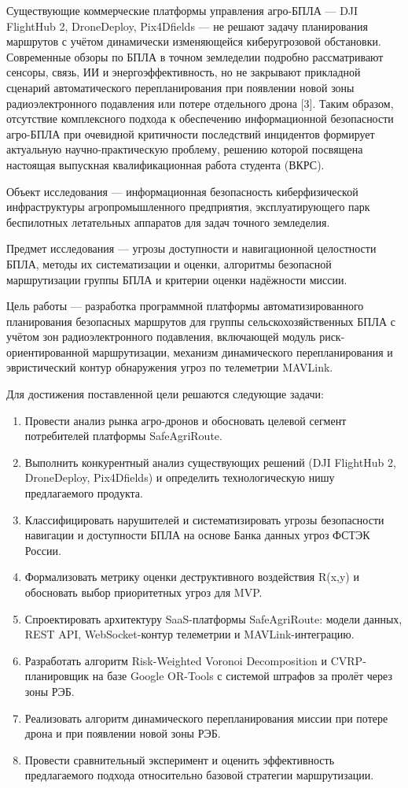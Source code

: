 \documentclass[14pt,a4paper]{extarticle}
\providecommand{\tightlist}{%
  \setlength{\itemsep}{0pt}\setlength{\parskip}{0pt}}
\begin{document}
Существующие коммерческие платформы управления агро-БПЛА --- DJI FlightHub 2, DroneDeploy, Pix4Dfields --- не решают задачу планирования маршрутов с учётом динамически изменяющейся киберугрозовой обстановки. Современные обзоры по БПЛА в точном земледелии подробно рассматривают сенсоры, связь, ИИ и энергоэффективность, но не закрывают прикладной сценарий автоматического перепланирования при появлении новой зоны радиоэлектронного подавления или потере отдельного дрона {[}3{]}. Таким образом, отсутствие комплексного подхода к обеспечению информационной безопасности агро-БПЛА при очевидной критичности последствий инцидентов формирует актуальную научно-практическую проблему, решению которой посвящена настоящая выпускная квалификационная работа студента (ВКРС).

Объект исследования --- информационная безопасность киберфизической инфраструктуры агропромышленного предприятия, эксплуатирующего парк беспилотных летательных аппаратов для задач точного земледелия.

Предмет исследования --- угрозы доступности и навигационной целостности БПЛА, методы их систематизации и оценки, алгоритмы безопасной маршрутизации группы БПЛА и критерии оценки надёжности миссии.

Цель работы --- разработка программной платформы автоматизированного планирования безопасных маршрутов для группы сельскохозяйственных БПЛА с учётом зон радиоэлектронного подавления, включающей модуль риск-ориентированной маршрутизации, механизм динамического перепланирования и эвристический контур обнаружения угроз по телеметрии MAVLink.

Для достижения поставленной цели решаются следующие задачи:

\begin{enumerate}
\def\labelenumi{\arabic{enumi}.}
\tightlist
\item
  Провести анализ рынка агро-дронов и обосновать целевой сегмент потребителей платформы SafeAgriRoute.
\item
  Выполнить конкурентный анализ существующих решений (DJI FlightHub 2, DroneDeploy, Pix4Dfields) и определить технологическую нишу предлагаемого продукта.
\item
  Классифицировать нарушителей и систематизировать угрозы безопасности навигации и доступности БПЛА на основе Банка данных угроз ФСТЭК России.
\item
  Формализовать метрику оценки деструктивного воздействия R(x,y) и обосновать выбор приоритетных угроз для MVP.
\item
  Спроектировать архитектуру SaaS-платформы SafeAgriRoute: модели данных, REST API, WebSocket-контур телеметрии и MAVLink-интеграцию.
\item
  Разработать алгоритм Risk-Weighted Voronoi Decomposition и CVRP-планировщик на базе Google OR-Tools с системой штрафов за пролёт через зоны РЭБ.
\item
  Реализовать алгоритм динамического перепланирования миссии при потере дрона и при появлении новой зоны РЭБ.
\item
  Провести сравнительный эксперимент и оценить эффективность предлагаемого подхода относительно базовой стратегии маршрутизации.
\end{enumerate}
\end{document}
